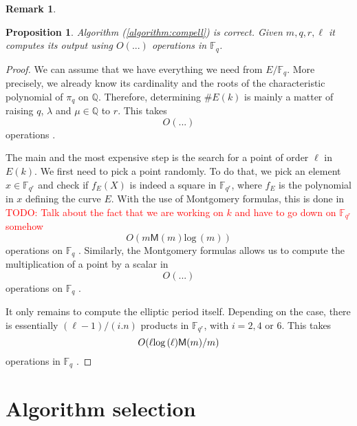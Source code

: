 \documentclass[12pt]{article}
\theoremstyle{plain}
\newtheorem{proposition}[theorem]{Proposition}
\theoremstyle{definition}
\newtheorem*{remark}{Remark}
\newcommand{\todo}[1]{\textcolor{red}{TODO: #1}}
\def\Q{\ensuremath{\mathbb{Q}}}
\def\F{\ensuremath{\mathbb{F}}}
\def\MM{\ensuremath{\mathsf{M}}}
\newcounter{algorithm}
\begin{document}
\begin{remark}

\end{remark}

\begin{proposition}
Algorithm (\ref{algorithm:compell}) is correct. Given $m,q,r,\ell$ it computes
its output using $O(...)$ operations in $\F_q$.
\end{proposition}
\begin{proof}
We can assume that we have everything we need from $E/\F_q$. More precisely, we
already know its cardinality and the roots of the characteristic polynomial of
$\pi_q$ on $\Q$. Therefore, determining $\#E(k)$ is mainly a matter of
raising $q$, $\lambda$ and $\mu\in\Q$ to $r$. This takes 
\begin{equation}
O(...) 
\end{equation}
operations \cite{}.

The main and the most expensive step is the search for a point of order $\ell$
in $E(k)$. We first need to pick a point randomly. To do that, we pick an
element $x\in \F_{q^r}$ and check if $f_E(X)$ is indeed a square in 
$\F_{q^r}$, where $f_E$ is the polynomial in $x$ defining the curve $E$. With
the use of Montgomery formulas, this is done in
\todo{Talk about the fact that we are working on $k$ and have to go down on
$\F_{q^r}$ somehow}
\begin{equation}
O(m \MM(m)\text{log}\,(m))
\end{equation}
operations on $\F_q$ \cite{}. Similarly, the Montgomery formulas allows us to 
compute the multiplication of a point by a scalar in
\begin{equation}
\label{equation:complexityofscalarprod}
O(...)
\end{equation}
operations on $\F_q$ \cite{}.

It only remains to compute the elliptic period itself. Depending on the case,
there is essentially $(\ell-1)/(i.n)$ products in $\F_{q^r}$, with $i=2,4$ or 
$6$. This takes 
\begin{equation}
O(\ell\text{log\,}(\ell)\MM(m)/m)
\end{equation}
operations in $\F_q$ \cite{}.



\end{proof}

\section{Algorithm selection}
\label{sec:selection}
\end{document}
